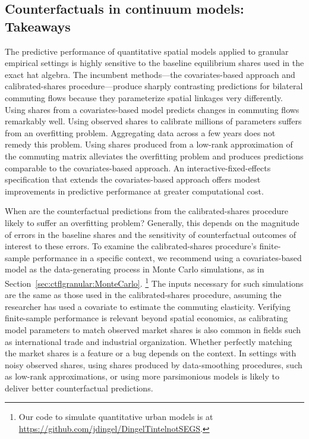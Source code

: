 \documentclass[11pt]{article}
\theoremstyle{definition}
\begin{document}
\subsection{Counterfactuals in continuum models: Takeaways}

The predictive performance of quantitative spatial models applied to granular empirical settings
is highly sensitive to the baseline equilibrium shares used in the exact hat algebra.
The incumbent methods---the covariates-based approach and calibrated-shares procedure---produce sharply contrasting predictions for bilateral commuting flows
because they parameterize spatial linkages very differently.
Using shares from a covariates-based model predicts changes in commuting flows remarkably well.
Using observed shares to calibrate millions of parameters suffers from an overfitting problem.
Aggregating data across a few years does not remedy this problem.
Using shares produced from a low-rank approximation of the commuting matrix
alleviates the overfitting problem and produces predictions comparable to the covariates-based approach.
An interactive-fixed-effects specification that extends the covariates-based approach offers modest improvements in predictive performance at greater computational cost.

When are the counterfactual predictions from the calibrated-shares procedure likely to suffer an overfitting problem?
Generally,
this depends on the magnitude of errors in the baseline shares
and
the sensitivity of counterfactual outcomes of interest to these errors.
To examine the calibrated-shares procedure's finite-sample performance in a specific context,
we recommend using a covariates-based model as the data-generating process in Monte Carlo simulations, as in Section~\ref{sec:ctflgranular:MonteCarlo}.%
\footnote{Our code to simulate quantitative urban models is at \url{https://github.com/jdingel/DingelTintelnotSEGS}.}
The inputs necessary for such simulations are the same as those used in the calibrated-shares procedure,
assuming the researcher has used a covariate to estimate the commuting elasticity.
Verifying finite-sample performance is relevant beyond spatial economics, as calibrating model parameters to match observed market shares 
is also common in fields such as international trade and industrial organization.
Whether perfectly matching the market shares is a feature or a bug depends on the context.
In settings with noisy observed shares,
using shares produced by data-smoothing procedures, such as low-rank approximations, or using more parsimonious models is likely to deliver better counterfactual predictions.
\end{document}
